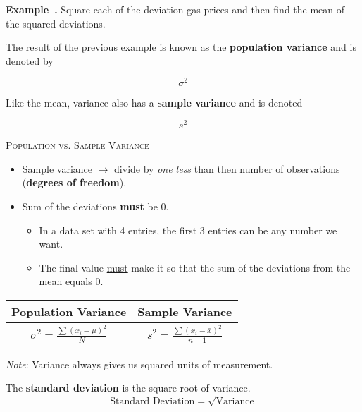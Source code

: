 \documentclass{article}
\newcounter{example}[section]
\newenvironment{example}[1][]{\refstepcounter{example}\par\medskip
   {\color{red}\textbf{Example~\theexample. #1}}}{\medskip}
\begin{document}
\begin{example}
Square each of the deviation gas prices and then find the mean of the squared deviations.
\end{example}

\newpage 

The result of the previous example is known as the {\color{blue}\textbf{population variance}} and is denoted by 

\[\sigma^2\] 

\vspace{0.25in}

Like the mean, variance also has a {\color{red}\textbf{sample variance}} and is denoted 

\[s^2\]
\vspace{0.5in}

\textsc{Population vs. Sample Variance}

\begin{itemize}
    \item Sample variance $\longrightarrow$ divide by \emph{one less} than then number of observations ({\color{blue}\textbf{degrees of freedom}}).
    \item Sum of the deviations \textbf{must} be 0.
    \begin{itemize}
    \item In a data set with 4 entries, the first 3 entries can be any number we want.
    \item The final value \underline{must} make it so that the sum of the deviations from the mean equals 0.
    \end{itemize}
\end{itemize}
\vspace{0.5in}

\begin{center}
\setlength{\extrarowheight}{7pt}
\begin{tabular}{c|c}
\textbf{Population Variance} & \textbf{Sample Variance} \\ \hline
$\sigma^2 = \frac{\sum (x_i-\mu)^2}{N}$	&	$s^2 = \frac{\sum (x_i-\bar{x})^2}{n-1}$
\end{tabular}
\end{center}

\vspace{0.25in}

\emph{Note}: Variance always gives us squared units of measurement.
\vspace{0.75in}

\begin{tcolorbox}[colframe=green!20!black, colback = green!30!white,title=\textbf{Standard Deviation}]
The \textbf{standard deviation} is the square root of variance.
\[
\text{Standard Deviation} = \sqrt{\text{Variance}}
\]
\end{tcolorbox}
\vspace{0.25in}
\end{document}
